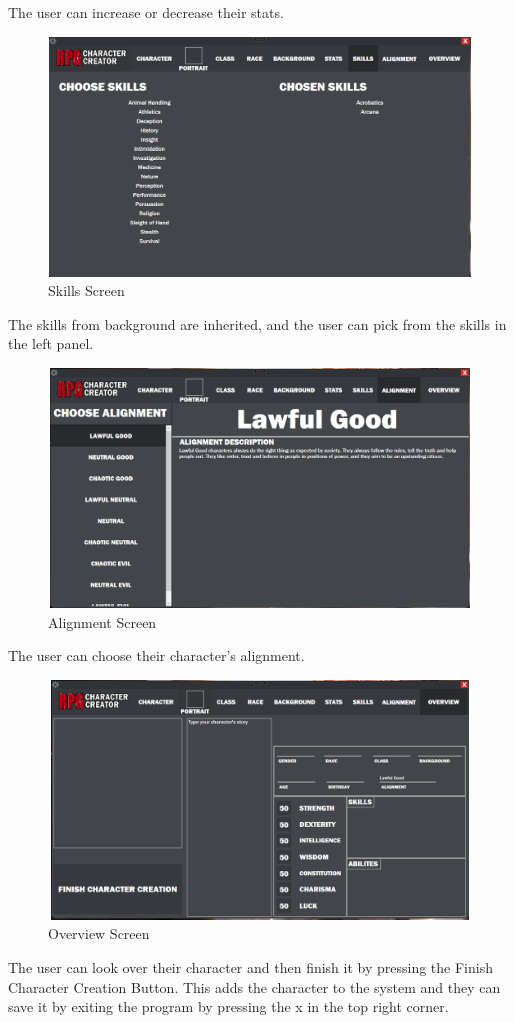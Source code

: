 \documentclass[10pt,conference,onecolumn,compsoc]{IEEEtran}
\begin{document}
The user can increase or decrease their stats.
\begin{figure}[H]
\includegraphics[height=240px, width=426px]{Finished Interface/skillsScreen.png}
\caption{Skills Screen}
\centering
\end{figure}
The skills from background are inherited, and the user can pick from the skills in the left panel.
\begin{figure}[H]
\includegraphics[height=240px, width=426px]{Finished Interface/alignmentScreen.png}
\caption{Alignment Screen}
\centering
\end{figure}
The user can choose their character's alignment.
\begin{figure}[H]
\includegraphics[height=240px, width=426px]{Finished Interface/overviewScreen.png}
\caption{Overview Screen}
\centering
\end{figure}
The user can look over their character and then finish it by pressing the Finish Character Creation Button. This adds the character to the system and they can save it by exiting the program by pressing the x in the top right corner.
\end{document}
